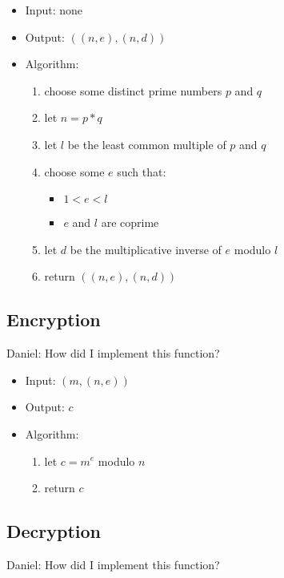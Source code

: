 \begin{itemize}
\item Input: none
\item Output: $((n, e), (n, d))$
\item Algorithm:
  \begin{enumerate}
  \item choose some distinct prime numbers $p$ and $q$
  \item let $n = p * q$
  \item let $l$ be the least common multiple of $p$ and $q$
  \item choose some $e$ such that:
  \begin{itemize}
    \item $1 < e < l$
    \item $e$ and $l$ are coprime
  \end{itemize}
  \item let $d$ be the multiplicative inverse of $e$
    modulo $l$
  \item return $((n, e), (n, d))$
  \end{enumerate}
\end{itemize}


\subsection{Encryption}

Daniel:
How did I implement this function?

\begin{itemize}
\item Input: $(m, (n, e))$
\item Output: $c$
\item Algorithm:
  \begin{enumerate}
  \item let $c = m^e$ modulo $n$
  \item return $c$
  \end{enumerate}
\end{itemize}


\subsection{Decryption}

Daniel:
How did I implement this function?

